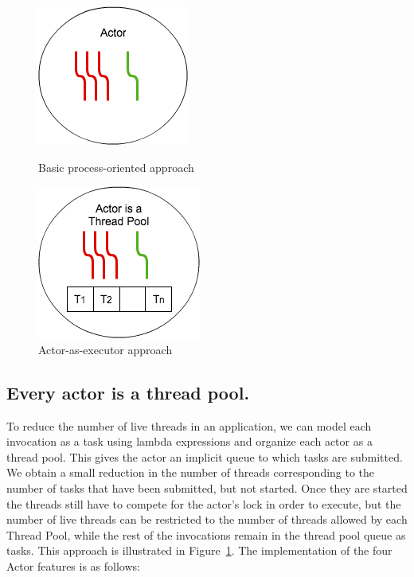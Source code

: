 \begin{figure}
	\centering
	\begin{minipage}{.47\textwidth}
		\centering
		\includegraphics[scale=0.6]{mt.png}
		\caption{Basic process-oriented approach}
		\label{tp}
	\end{minipage}
	\begin{minipage}{.52\textwidth}
		\centering
		\includegraphics[scale=0.6]{atp.png}
		\caption{Actor-as-executor approach}
		\label{atp}	
	\end{minipage}
\end{figure}

\subsection{Every actor is a thread pool.}
To reduce the number of live threads in an application, we can model each invocation as a task using lambda expressions and organize each actor as a thread pool. This gives the actor an implicit queue to which tasks are submitted. We obtain a small reduction in the number of threads corresponding to the number of tasks that have been submitted, but not started. Once they are started the threads still have to compete for the actor's lock in order to execute, but the number of live threads can be restricted to the number of threads allowed by each Thread Pool, while the rest of the invocations remain in the thread pool queue as tasks. This approach is illustrated in Figure~\ref{atp}. The implementation of the four Actor features is as follows:

